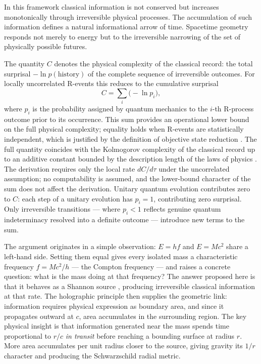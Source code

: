\documentclass[12pt]{article}
\begin{document}
In this framework classical information is not conserved but increases
monotonically through irreversible physical processes.
The accumulation of such information defines a natural informational
arrow of time.
Spacetime geometry responds not merely to energy but to the irreversible
narrowing of the set of physically possible futures.

The quantity $C$ denotes the physical complexity of the classical
record: the total surprisal $-\ln p(\text{history})$ of the complete
sequence of irreversible outcomes.
For locally uncorrelated R-events this reduces to the cumulative
surprisal
\begin{equation}
  C = \sum_i \bigl(-\ln p_i\bigr),
\end{equation}
where $p_i$ is the probability assigned by quantum mechanics to the
$i$-th R-process outcome prior to its occurrence.
This sum provides an operational lower bound on the full physical
complexity; equality holds when R-events are statistically independent,
which is justified by the definition of objective state reduction
\cite{Penrose1994}.
The full quantity coincides with the Kolmogorov complexity of the
classical record up to an additive constant bounded by the description
length of the laws of physics \cite{Kolmogorov1965}.
The derivation requires only the local rate $dC/d\tau$ under the
uncorrelated assumption; no computability is assumed, and the
lower-bound character of the sum does not affect the derivation.
Unitary quantum evolution contributes zero to $C$: each step of a
unitary evolution has $p_i = 1$, contributing zero surprisal.
Only irreversible transitions --- where $p_i < 1$ reflects genuine
quantum indeterminacy resolved into a definite outcome --- introduce
new terms to the sum.

The argument originates in a simple observation: $E = hf$ and $E = Mc^2$
share a left-hand side.
Setting them equal gives every isolated mass a characteristic frequency
$f = Mc^2/h$ --- the Compton frequency --- and raises a concrete
question: what is the mass doing at that frequency?
The answer proposed here is that it behaves as a Shannon source
\cite{Shannon1948}, producing irreversible classical information at that
rate.
The holographic principle then supplies the geometric link: information
requires physical expression as boundary area, and since it propagates
outward at $c$, area accumulates in the surrounding region.
The key physical insight is that information generated near the mass
spends time proportional to $r/c$ \emph{in transit} before reaching
a bounding surface at radius $r$.
More area accumulates per unit radius closer to the source, giving
gravity its $1/r$ character and producing the Schwarzschild radial
metric.
\end{document}
